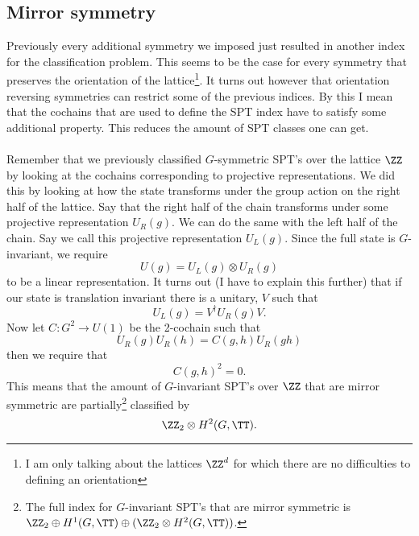 \subsection{Mirror symmetry}
Previously every additional symmetry we imposed just resulted in another index for the classification problem. This seems to be the case for every symmetry that preserves the orientation of the lattice\footnote{I am only talking about the lattices $\ZZ^d$ for which there are no difficulties to defining an orientation}. It turns out however that orientation reversing symmetries can restrict some of the previous indices. By this I mean that the cochains that are used to define the SPT index have to satisfy some additional property. This reduces the amount of SPT classes one can get.\\\\
Remember that we previously classified $G$-symmetric SPT's over the lattice $\ZZ$ by looking at the cochains corresponding to projective representations. We did this by looking at how the state transforms under the group action on the right half of the lattice. Say that the right half of the chain transforms under some projective representation $U_R(g)$. We can do the same with the left half of the chain. Say we call this projective representation $U_L(g)$. Since the full state is $G$-invariant, we require
\begin{equation}
	U(g)=U_L(g)\otimes U_R(g)
\end{equation}
to be a linear representation. It turns out ({\color{red}I have to explain this further}) that if our state is translation invariant there is a unitary, $V$ such that
\begin{equation}
	U_L(g)=V^\dagger U_R(g)V.
\end{equation}
Now let $C:G^2\rightarrow U(1)$ be the 2-cochain such that
\begin{equation}
	U_R(g)U_R(h)=C(g,h)U_R(gh)
\end{equation}
then we require that
\begin{equation}
	C(g,h)^2=0.
\end{equation}
This means that the amount of $G$-invariant SPT's over $\ZZ$ that are mirror symmetric are partially\footnote{The full index for $G$-invariant SPT's that are mirror symmetric is $\ZZ_2\oplus H^1(G,\TT)\oplus (\ZZ_2\otimes H^2(G,\TT))$.} classified by
\begin{equation}
	\ZZ_2\otimes H^2(G,\TT).
\end{equation}
